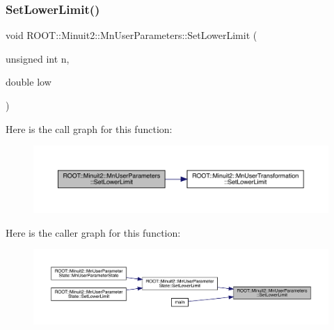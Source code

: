 \mbox{\label{classROOT_1_1Minuit2_1_1MnUserParameters_a5fa6d9f50413c05aabed1d11ee26c6cc}} 
\subsubsection{\texorpdfstring{SetLowerLimit()}{SetLowerLimit()}\hspace{0.1cm}{\footnotesize\ttfamily [1/4]}}
{\footnotesize\ttfamily void R\+O\+O\+T\+::\+Minuit2\+::\+Mn\+User\+Parameters\+::\+Set\+Lower\+Limit (\begin{DoxyParamCaption}\item[{unsigned int}]{n,  }\item[{double}]{low }\end{DoxyParamCaption})}

Here is the call graph for this function\+:\nopagebreak
\begin{figure}[H]
\begin{center}
\leavevmode
\includegraphics[width=350pt]{d6/d10/classROOT_1_1Minuit2_1_1MnUserParameters_a5fa6d9f50413c05aabed1d11ee26c6cc_cgraph}
\end{center}
\end{figure}
Here is the caller graph for this function\+:\nopagebreak
\begin{figure}[H]
\begin{center}
\leavevmode
\includegraphics[width=350pt]{d6/d10/classROOT_1_1Minuit2_1_1MnUserParameters_a5fa6d9f50413c05aabed1d11ee26c6cc_icgraph}
\end{center}
\end{figure}
\mbox{\label{classROOT_1_1Minuit2_1_1MnUserParameters_a5fa6d9f50413c05aabed1d11ee26c6cc}} 
